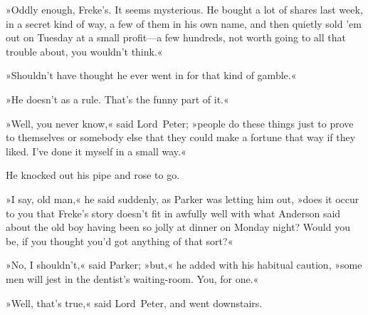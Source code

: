 »Oddly enough, Freke's. It seems mysterious. He bought a lot of shares last week, in a secret kind of way, a few of them in his own name, and then quietly sold 'em out on Tuesday at a small profit—a few hundreds, not worth going to all that trouble about, you wouldn't think.«

»Shouldn't have thought he ever went in for that kind of gamble.«

»He doesn't as a rule. That's the funny part of it.«

»Well, you never know,« said Lord~Peter; »people do these things just to prove to themselves or somebody else that they could make a fortune that way if they liked. I've done it myself in a small way.«

He knocked out his pipe and rose to go.

»I say, old man,« he said suddenly, as Parker was letting him out, »does it occur to you that Freke's story doesn't fit in awfully well with what Anderson said about the old boy having been so jolly at dinner on Monday night? Would you be, if you thought you'd got anything of that sort?«

»No, I shouldn't,« said Parker; »but,« he added with his habitual caution, »some men will jest in the dentist's waiting-room. You, for one.«

»Well, that's true,« said Lord~Peter, and went downstairs.
